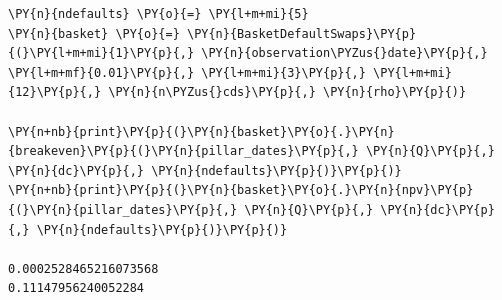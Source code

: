 \begin{Answer}
\begin{tcolorbox}[size=fbox, boxrule=1pt, colback=cellbackground, colframe=cellborder]
\begin{Verbatim}[commandchars=\\\{\}]
\PY{n}{ndefaults} \PY{o}{=} \PY{l+m+mi}{5}
\PY{n}{basket} \PY{o}{=} \PY{n}{BasketDefaultSwaps}\PY{p}{(}\PY{l+m+mi}{1}\PY{p}{,} \PY{n}{observation\PYZus{}date}\PY{p}{,} \PY{l+m+mf}{0.01}\PY{p}{,} \PY{l+m+mi}{3}\PY{p}{,} \PY{l+m+mi}{12}\PY{p}{,} \PY{n}{n\PYZus{}cds}\PY{p}{,} \PY{n}{rho}\PY{p}{)}
	
\PY{n+nb}{print}\PY{p}{(}\PY{n}{basket}\PY{o}{.}\PY{n}{breakeven}\PY{p}{(}\PY{n}{pillar_dates}\PY{p}{,} \PY{n}{Q}\PY{p}{,} \PY{n}{dc}\PY{p}{,} \PY{n}{ndefaults}\PY{p}{)}\PY{p}{)}
\PY{n+nb}{print}\PY{p}{(}\PY{n}{basket}\PY{o}{.}\PY{n}{npv}\PY{p}{(}\PY{n}{pillar_dates}\PY{p}{,} \PY{n}{Q}\PY{p}{,} \PY{n}{dc}\PY{p}{,} \PY{n}{ndefaults}\PY{p}{)}\PY{p}{)}

0.0002528465216073568
0.11147956240052284
\end{Verbatim}
\end{tcolorbox}	
\end{Answer}

